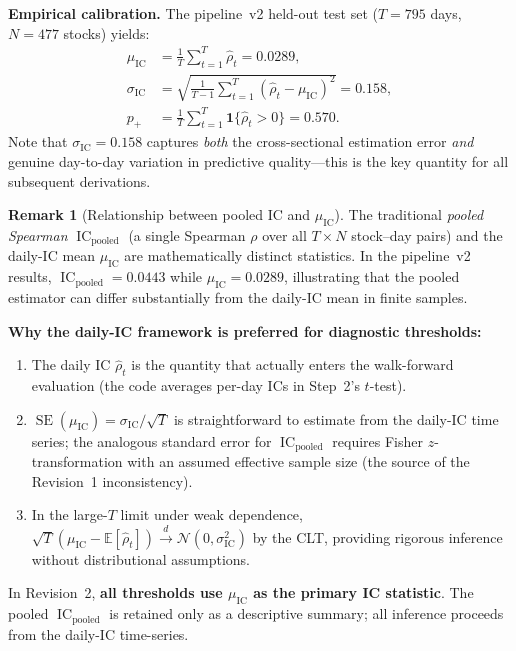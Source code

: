 \documentclass[11pt,a4paper]{article}
\theoremstyle{definition}
\newtheorem{remark}{Remark}[section]
\newcommand{\IC}{\operatorname{IC}}
\newcommand{\E}{\mathbb{E}}
\newcommand{\SE}{\operatorname{SE}}
\newcommand{\N}{\mathcal{N}}
\begin{document}
\textbf{Empirical calibration.} The pipeline~v2 held-out test set
($T=795$ days, $N=477$ stocks) yields:
\begin{align}
    \mu_{\IC} &= \frac{1}{T}\sum_{t=1}^{T}\hat{\rho}_{t}
               = 0.0289, \label{eq:mu_ic} \\[4pt]
    \sigma_{\IC} &= \sqrt{\frac{1}{T-1}\sum_{t=1}^{T}
                          (\hat{\rho}_{t}-\mu_{\IC})^{2}}
                 = 0.158, \label{eq:sigma_ic} \\[4pt]
    p_{+} &= \frac{1}{T}\sum_{t=1}^{T} \mathbf{1}\{\hat{\rho}_{t} > 0\}
           = 0.570. \label{eq:p_plus}
\end{align}
Note that $\sigma_{\IC}=0.158$ captures \emph{both} the cross-sectional
estimation error \emph{and} genuine day-to-day variation in predictive
quality---this is the key quantity for all subsequent derivations.

\begin{remark}[Relationship between pooled IC and $\mu_{\IC}$]
\label{rem:pooled_vs_mean}
The traditional \emph{pooled Spearman} $\IC_{\text{pooled}}$ (a single
Spearman $\rho$ over all $T \times N$ stock--day pairs) and the
daily-IC mean $\mu_{\IC}$ are mathematically distinct statistics.
In the pipeline~v2 results, $\IC_{\text{pooled}}=0.0443$ while
$\mu_{\IC}=0.0289$, illustrating that the pooled estimator can differ
substantially from the daily-IC mean in finite samples.
\medskip

\textbf{Why the daily-IC framework is preferred for diagnostic thresholds:}
\begin{enumerate}[nosep]
    \item The daily IC $\hat{\rho}_{t}$ is the quantity that actually
          enters the walk-forward evaluation (the code averages per-day
          ICs in Step~2's $t$-test).
    \item $\SE(\mu_{\IC})=\sigma_{\IC}/\sqrt{T}$ is straightforward
          to estimate from the daily-IC time series; the analogous
          standard error for $\IC_{\text{pooled}}$ requires Fisher
          $z$-transformation with an assumed effective sample size
          (the source of the Revision~1 inconsistency).
    \item In the large-$T$ limit under weak dependence,
          $\sqrt{T}(\mu_{\IC}-\E[\hat{\rho}_{t}]) \xrightarrow{d}
          \N(0,\sigma_{\IC}^{2})$ by the CLT, providing rigorous
          inference without distributional assumptions.
\end{enumerate}

In Revision~2, \textbf{all thresholds use $\mu_{\IC}$ as the primary
IC statistic}. The pooled $\IC_{\text{pooled}}$ is retained only as
a descriptive summary; all inference proceeds from the daily-IC
time-series.
\end{remark}
\end{document}
